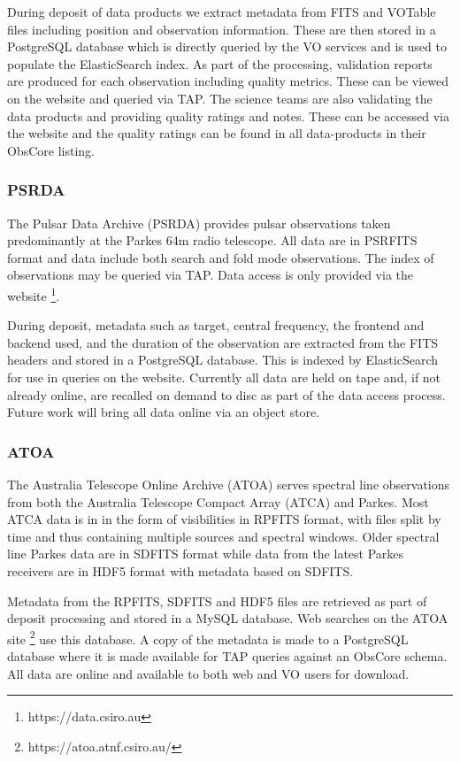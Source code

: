 \documentclass[11pt,a4paper]{ivoa}
\begin{document}
During deposit of data products we extract metadata from FITS and VOTable files including position and observation information.
These are then stored in a PostgreSQL database which is directly queried by the VO services and is used to populate the ElasticSearch index.
As part of the processing, validation reports are produced for each observation including quality metrics.
These can be viewed on the website and queried via TAP.
The science teams are also validating the data products and providing quality ratings and notes.
These can be accessed via the website and the quality ratings can be found in all data-products in their ObsCore listing.

\subsubsection{PSRDA}

The Pulsar Data Archive (PSRDA) provides pulsar observations taken predominantly at the Parkes 64m radio telescope.
All data are in PSRFITS format and data include both search and fold mode observations.
The index of observations may be queried via TAP. Data access is only provided via the website \footnote{https://data.csiro.au}.

During deposit, metadata such as target, central frequency, the frontend and backend used, and the duration of the observation are extracted from the FITS headers and stored in a PostgreSQL database.
This is indexed by ElasticSearch for use in queries on the website.
Currently all data are held on tape and, if not already online, are recalled on demand to disc as part of the data access process.
Future work will bring all data online via an object store.

\subsubsection{ATOA}

The Australia Telescope Online Archive (ATOA) serves spectral line observations from both the Australia Telescope Compact Array (ATCA) and Parkes.
Most ATCA data is in in the form of visibilities in RPFITS format, with files split by time and thus containing multiple sources and spectral windows.
Older spectral line Parkes data are in SDFITS format while data from the latest Parkes receivers are in HDF5 format with metadata based on SDFITS.

Metadata from the RPFITS, SDFITS and HDF5 files are retrieved as part of deposit processing and stored in a MySQL database. Web searches on the ATOA site \footnote{https://atoa.atnf.csiro.au/} use this database.
A copy of the metadata is made to a PostgreSQL database where it is made available for TAP queries against an ObsCore schema. 
All data are online and available to both web and VO users for download.
\end{document}
